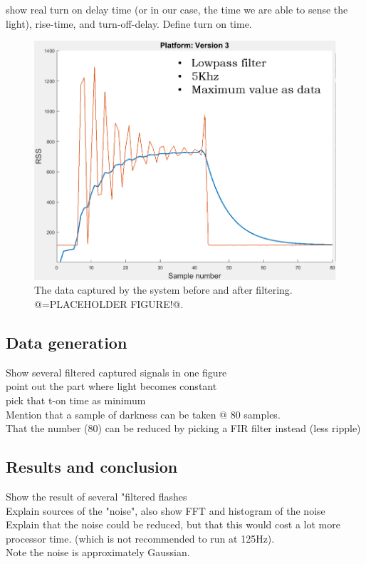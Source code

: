 show real turn on delay time (or in our case, the time we are able to sense the light), rise-time, and turn-off-delay.
Define turn on time.

\begin{figure}[]
	\includegraphics[width=\textwidth]{pics/66KhzFilter_placeholder.png}
	\caption{The data captured by the system before and after filtering. @=PLACEHOLDER FIGURE!@.}
	\label{fig:66KhzFilter}
\end{figure}

\subsection{Data generation}
\label{sec:Data_generation}
Show several filtered captured signals in one figure\\
point out the part where light becomes constant\\
pick that t-on time as minimum\\
Mention that a sample of darkness can be taken @ 80 samples.\\
That the number (80) can be reduced by picking a FIR filter instead (less ripple)\\

\subsection{Results and conclusion}
\label{sec:conclusion}
Show the result of several "filtered flashes\\
Explain sources of the "noise", also show FFT and histogram of the noise\\
Explain that the noise could be reduced, but that this would cost a lot more processor time. (which is not recommended to run at 125Hz).\\
Note the noise is approximately Gaussian.

